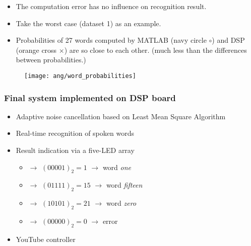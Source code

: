 \begin{frame}
\begin{itemize}
\item The computation error has no influence on recognition result.
\item Take the worst case (dataset 1) as an example.
\item Probabilities of 27 words computed by MATLAB (\textcolor{navy_matlab}{navy circle $\circ$}) and DSP (\textcolor{orange_matlab}{orange cross $\times$}) are so close to each other. (much less than the differences between probabilities.)
\end{itemize}

\begin{figure}[H]
\centering
\texttt{[image: ang/word\_probabilities]}
\end{figure}
\end{frame}


\begin{frame}
\frametitle{Final system implemented on DSP board}
\begin{itemize}
	\item Adaptive noise cancellation based on Least Mean Square Algorithm
	\item Real-time recognition of spoken words
	\item Result indication via a five-LED array
		\begin{itemize}
		\item \LED\offLED\offLED\offLED\offLED\onLED $\longrightarrow$ $(00001)_2 = 1$ $\longrightarrow$ word \textit{one}
		\item \LED\offLED\onLED\onLED\onLED\onLED $\longrightarrow$ $(01111)_2 = 15$ $\longrightarrow$ word \textit{fifteen}
		\item \LED\onLED\offLED\onLED\offLED\onLED $\longrightarrow$ $(10101)_2 = 21$ $\longrightarrow$ word \textit{zero}
		\item \LED\offLED\offLED\offLED\offLED\offLED $\longrightarrow$ $(00000)_2 = 0$ $\longrightarrow$ error
		\end{itemize}
	\item YouTube controller
\end{itemize}
\end{frame}

